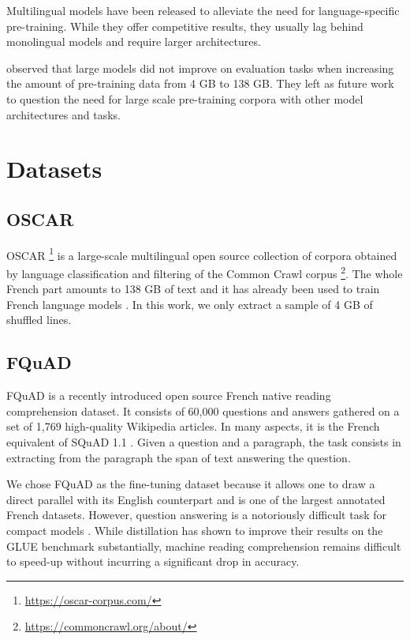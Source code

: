 \documentclass[11pt,a4paper]{article}
\begin{document}
Multilingual models \citep{bert, xlm, xlm-r} have been released to alleviate the need for language-specific pre-training. While they offer competitive results, they usually lag behind monolingual models and require larger architectures.

\citet{camembert} observed that large models did not improve on evaluation tasks when increasing the amount of pre-training data from 4 GB to 138 GB. They left as future work to question the need for large scale pre-training corpora with other model architectures and tasks.

\section{Datasets}

\subsection{OSCAR}

OSCAR \footnote{\url{https://oscar-corpus.com/}} \citep{oscar} is a large-scale multilingual open source collection of corpora obtained by language classification and filtering of the Common Crawl corpus \footnote{ \url{https://commoncrawl.org/about/}}. The whole French part amounts to 138 GB of text and it has already been used to train French language models \citep{camembert}. In this work, we only extract a sample of 4 GB of shuffled lines.

\subsection{FQuAD}

FQuAD \citep{fquad} is a recently introduced open source French native reading comprehension dataset. It consists of 60,000 questions and answers gathered on a set of 1,769 high-quality Wikipedia articles. In many aspects, it is the French equivalent of SQuAD 1.1 \citep{squad}. Given a question and a paragraph, the task consists in extracting from the paragraph the span of text answering the question.

We chose FQuAD as the fine-tuning dataset because it allows one to draw a direct parallel with its English counterpart \citep{fquad} and is one of the largest annotated French datasets. However, question answering is a notoriously difficult task for compact models \citep{structuredpruning}. While distillation has shown to improve their results on the GLUE benchmark \citep{glue} substantially, machine reading comprehension remains difficult to speed-up without incurring a significant drop in accuracy. 
\end{document}
